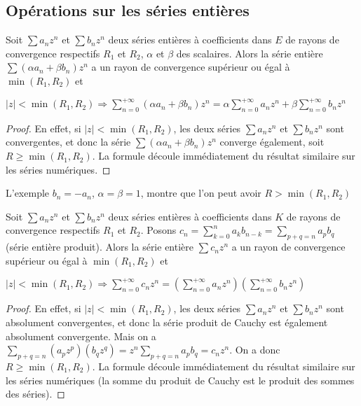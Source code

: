 \subsection{Opérations sur les séries entières}

\begin{prop}
Soit
$\sum a_n z^n$ et
$\sum b_n z^n$ deux séries entières à coefficients dans $E$ de
rayons de convergence respectifs $R_1$ et $R_2$, $\alpha$ et $\beta$
des scalaires. Alors la série entière
$\sum (\alpha a_n + \beta b_n) z^n$ a un rayon de convergence supérieur ou égal
à $\min(R_1,R_2)$ et

$|z| < \min(R_1,R_2) \Rightarrow \sum_{n=0}^{+\infty} (\alpha a_n + \beta b_n) z^n =
\alpha \sum_{n=0}^{+\infty} a_n z^n + \beta \sum_{n=0}^{+\infty} b_n z^n$
\end{prop}

\begin{proof}
En effet, si $|z| < \min(R_1,R_2)$,
les deux séries $\sum a_n z^n$ et
$\sum b_n z^n$ sont convergentes, et donc la série
$\sum (\alpha a_n + \beta b_n) z^n$ converge également, soit $R \geq \min(R_1,R_2)$. La formule
découle immédiatement du résultat similaire sur les séries numériques.
\end{proof}

\begin{rem}
L'exemple $b_n = -a_n$, $\alpha = \beta = 1$,
montre que l'on peut avoir $R > \min(R_1,R_2)$
\end{rem}

\begin{prop}
Soit
$\sum a_n z^n$ et
$\sum b_n z^n$ deux séries entières à coefficients dans $K$ de
rayons de convergence respectifs $R_1$ et $R_2$. Posons
$c_n = \sum_{k=0}^n a_k b_{n-k} = \sum_{p+q=n} a_p b_q$ (série entière produit). Alors la
série entière $\sum c_n z^n$ a un rayon de convergence supérieur ou égal à
$\min(R_1,R_2)$ et

$|z| < \min(R_1,R_2) \Rightarrow \sum_{n=0}^{+\infty} c_n z^n =
\left(\sum_{n=0}^{+\infty} a_n z^n\right)
\left(\sum_{n=0}^{+\infty} b_n z^n\right)$
\end{prop}

\begin{proof}
En effet, si $|z| < \min(R_1,R_2)$,
les deux séries $\sum a_n z^n$ et
$\sum b_n z^n$ sont absolument convergentes, et donc la
série produit de Cauchy est également absolument convergente. Mais on a
$\sum_{p+q=n} (a_p z^p)(b_q z^q) = z^n \sum_{p+q=n} a_p b_q = c_n z^n$. On a
donc $R \geq \min(R_1,R_2)$. La
formule découle immédiatement du résultat similaire sur les séries
numériques (la somme du produit de Cauchy est le produit des sommes des
séries).
\end{proof}

